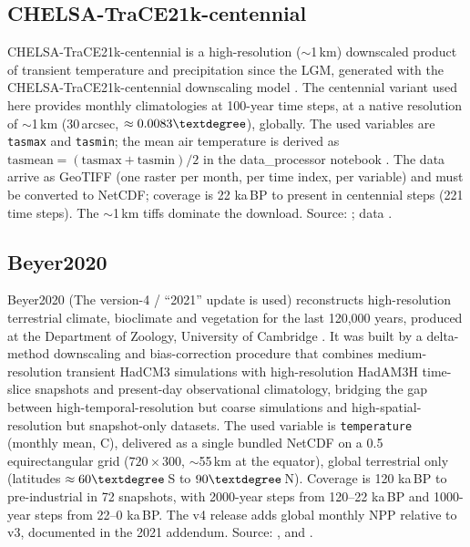 \documentclass{isprs} %
\newcommand{\dg}{\textdegree}
\newcommand{\degC}{\textdegree C}
\newcommand{\tabbr}[1]{\texttt{#1}}
\newcommand{\kaBP}{ka\,BP}
\begin{document}
\subsection{CHELSA-TraCE21k-centennial}
CHELSA-TraCE21k-centennial is a high-resolution ($\sim$1\,km) downscaled product of transient temperature and precipitation since the LGM, generated with the CHELSA-TraCE21k-centennial downscaling model \cite{chelsa_trace21k_paper,chelsa_trace21k_data}. The centennial variant used here provides monthly climatologies at 100-year time steps, at a native resolution of $\sim$1\,km (30\,arcsec, $\approx 0.0083\dg$), globally. The used variables are \tabbr{tasmax} and \tabbr{tasmin}; the mean air temperature is derived as $\mathrm{tasmean} = (\mathrm{tasmax}+\mathrm{tasmin})/2$ in the data\_processor notebook \cite{giersch2026_paleoclimate_model_comparison}. The data arrive as GeoTIFF (one raster per month, per time index, per variable) and must be converted to NetCDF; coverage is 22 \kaBP{} to present in centennial steps (221 time steps). The $\sim$1\,km tiffs dominate the download. Source: \cite{chelsa_trace21k_paper}; data \cite{chelsa_trace21k_data}.

\subsection{Beyer2020}
Beyer2020 (The version-4 / ``2021'' update is used) reconstructs high-resolution terrestrial climate, bioclimate and vegetation for the last 120,000 years, produced at the Department of Zoology, University of Cambridge \cite{beyer2020_paper,beyer2021_addendum}. It was built by a delta-method downscaling and bias-correction procedure that combines medium-resolution transient HadCM3 simulations with high-resolution HadAM3H time-slice snapshots and present-day observational climatology, bridging the gap between high-temporal-resolution but coarse simulations and high-spatial-resolution but snapshot-only datasets. The used variable is \tabbr{temperature} (monthly mean, \degC), delivered as a single bundled NetCDF on a 0.5\dg{} equirectangular grid ($720\times300$, $\sim$55\,km at the equator), global terrestrial only (latitudes $\approx 60\dg$\,S to $90\dg$\,N). Coverage is 120 \kaBP{} to pre-industrial in 72 snapshots, with 2000-year steps from 120--22 \kaBP{} and 1000-year steps from 22--0 \kaBP. The v4 release adds global monthly NPP relative to v3, documented in the 2021 addendum. Source: \cite{beyer2020_paper}, \cite{beyer2021_addendum} and \cite{beyer2021_data_4}.
\end{document}
